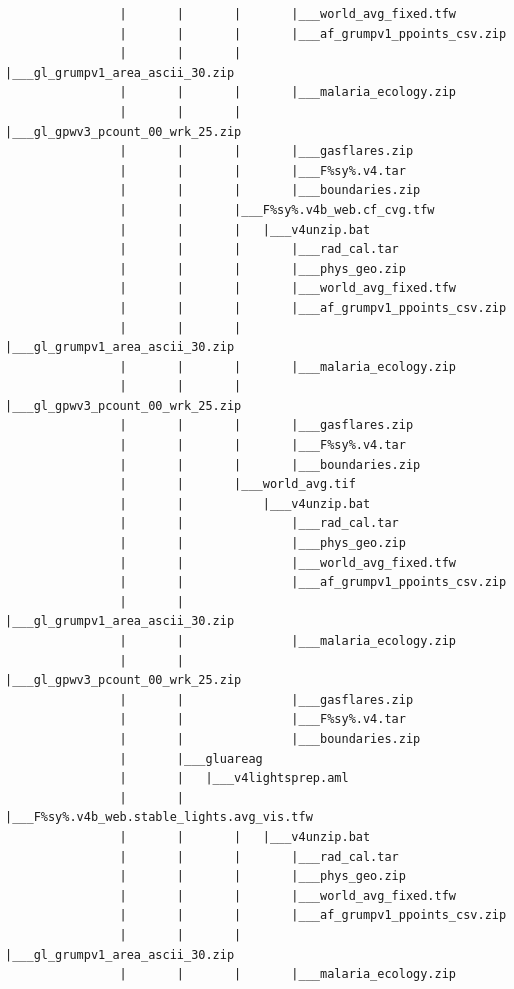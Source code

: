 \documentclass[]{book}
\begin{document}
\begin{verbatim}
                |       |       |       |___world_avg_fixed.tfw
                |       |       |       |___af_grumpv1_ppoints_csv.zip
                |       |       |       |___gl_grumpv1_area_ascii_30.zip
                |       |       |       |___malaria_ecology.zip
                |       |       |       |___gl_gpwv3_pcount_00_wrk_25.zip
                |       |       |       |___gasflares.zip
                |       |       |       |___F%sy%.v4.tar
                |       |       |       |___boundaries.zip
                |       |       |___F%sy%.v4b_web.cf_cvg.tfw
                |       |       |   |___v4unzip.bat
                |       |       |       |___rad_cal.tar
                |       |       |       |___phys_geo.zip
                |       |       |       |___world_avg_fixed.tfw
                |       |       |       |___af_grumpv1_ppoints_csv.zip
                |       |       |       |___gl_grumpv1_area_ascii_30.zip
                |       |       |       |___malaria_ecology.zip
                |       |       |       |___gl_gpwv3_pcount_00_wrk_25.zip
                |       |       |       |___gasflares.zip
                |       |       |       |___F%sy%.v4.tar
                |       |       |       |___boundaries.zip
                |       |       |___world_avg.tif
                |       |           |___v4unzip.bat
                |       |               |___rad_cal.tar
                |       |               |___phys_geo.zip
                |       |               |___world_avg_fixed.tfw
                |       |               |___af_grumpv1_ppoints_csv.zip
                |       |               |___gl_grumpv1_area_ascii_30.zip
                |       |               |___malaria_ecology.zip
                |       |               |___gl_gpwv3_pcount_00_wrk_25.zip
                |       |               |___gasflares.zip
                |       |               |___F%sy%.v4.tar
                |       |               |___boundaries.zip
                |       |___gluareag
                |       |   |___v4lightsprep.aml
                |       |       |___F%sy%.v4b_web.stable_lights.avg_vis.tfw
                |       |       |   |___v4unzip.bat
                |       |       |       |___rad_cal.tar
                |       |       |       |___phys_geo.zip
                |       |       |       |___world_avg_fixed.tfw
                |       |       |       |___af_grumpv1_ppoints_csv.zip
                |       |       |       |___gl_grumpv1_area_ascii_30.zip
                |       |       |       |___malaria_ecology.zip

\end{verbatim}
\end{document}
